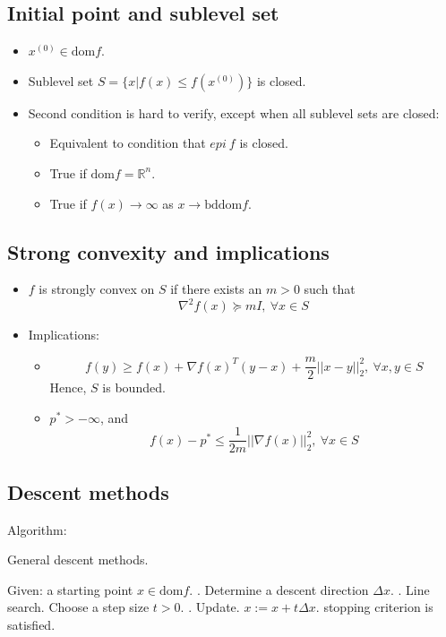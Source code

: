 \subsection{Initial point and sublevel set}
\begin{itemize}
    \item $x^{(0)} \in \text{dom} f$.
    \item Sublevel set $S = \{x | f(x) \le f(x^{(0)})\}$ is closed.
    \item Second condition is hard to verify, except when all sublevel sets are closed:
    \begin{itemize}
        \item Equivalent to condition that $epi \ f$ is closed.
        \item True if $\text{dom} f = \mathbb{R}^n$.
        \item True if $f(x) \rightarrow \infty$ as $x \rightarrow \text{bddom} f$.
    \end{itemize}
\end{itemize}

\subsection{Strong convexity and implications}
\begin{itemize}
    \item $f$ is strongly convex on $S$ if there exists an $m > 0$ such that
    $$
    \nabla^2 f(x) \succeq mI, \ \forall x \in S
    $$
    \item Implications:
    \begin{itemize}
        \item 
        $$
        f(y) \ge f(x) + \nabla f(x)^T(y - x) + \frac{m}{2}||x - y||^2_2, \ \forall x, y \in S
        $$
        Hence, $S$ is bounded.
        \item $p^* > - \infty$, and 
        $$
        f(x) - p^* \le \frac{1}{2m}||\nabla f(x)||^2_2, \ \forall x \in S
        $$
    \end{itemize}
\end{itemize}

\subsection{Descent methods}
Algorithm:
\begin{algorithm}[H]
	\caption{General descent methods.}
	\begin{algorithmic}[1]
        \State Given: a starting point $x \in \text{dom} f$.
        \Repeat
            . Determine a descent direction $\Delta x$.
            . Line search. Choose a step size $t > 0$.
            . Update. $x := x + t\Delta x$.
        \Until stopping criterion is satisfied.
	\end{algorithmic}
\end{algorithm}

